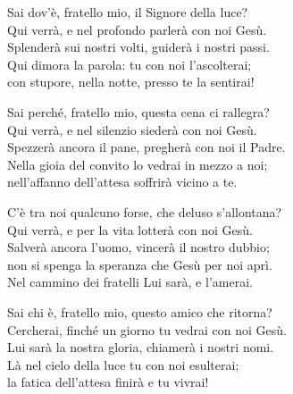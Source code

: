 
\strofa Sai dov'è, fratello mio, il Signore della luce?\\
Qui verrà, e nel profondo parlerà con noi Gesù.\\
Splenderà sui nostri volti, guiderà i nostri passi.\\ 
Qui dimora la parola: tu con noi l'ascolterai;\\
con stupore, nella notte, presso te la sentirai!

\spazio

\strofa Sai perché, fratello mio, questa cena ci rallegra?\\
Qui verrà, e nel silenzio siederà con noi Gesù.\\
Spezzerà ancora il pane, pregherà con noi il Padre.\\ 
Nella gioia del convito lo vedrai in mezzo a noi;\\
nell'affanno dell'attesa soffrirà vicino a te.

\spazio

\strofa C'è tra noi qualcuno forse, che deluso s'allontana?\\
Qui verrà, e per la vita lotterà con noi Gesù.\\
Salverà ancora l'uomo, vincerà il nostro dubbio;\\
non si spenga la speranza che Gesù per noi aprì.\\
Nel cammino dei fratelli Lui sarà, e l'amerai.

\spazio

\strofa Sai chi è, fratello mio, questo amico che ritorna?\\
Cercherai, finché un giorno tu vedrai con noi Gesù.\\
Lui sarà la nostra gloria, chiamerà i nostri nomi.\\
Là nel cielo della luce tu con noi esulterai;\\
la fatica dell'attesa finirà e tu vivrai!